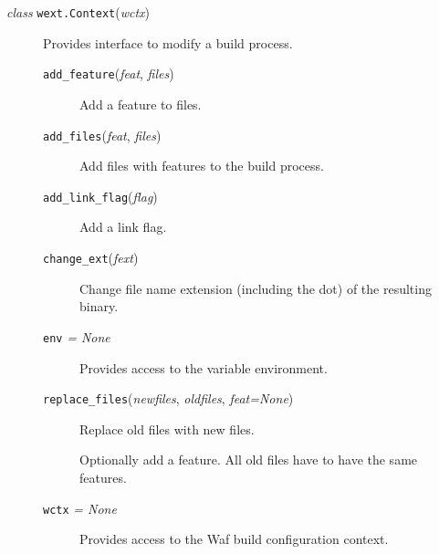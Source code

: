 \begin{description}
\item[ \emph{class} \texttt{wext.}\texttt{Context}{(}\emph{wctx}{)}]
Provides interface to modify a build process.

\begin{description}
\item[ \texttt{add\_feature}{(}\emph{feat}, \emph{files}{)}]
Add a feature to files.
\end{description}

\begin{description}
\item[ \texttt{add\_files}{(}\emph{feat}, \emph{files}{)}]
Add files with features to the build process.
\end{description}

\begin{description}
\item[ \texttt{add\_link\_flag}{(}\emph{flag}{)}]
Add a link flag.
\end{description}

\begin{description}
\item[ \texttt{change\_ext}{(}\emph{fext}{)}]
Change file name extension (including the dot) of the resulting binary.
\end{description}

\begin{description}
\item[ \texttt{env} \emph{= None}]
Provides access to the variable environment.
\end{description}

\begin{description}
\item[ \texttt{replace\_files}{(}\emph{newfiles}, \emph{oldfiles},
\emph{feat=None}{)}]
Replace old files with new files.

Optionally add a feature. All old files have to have the same features.
\end{description}

\begin{description}
\item[ \texttt{wctx} \emph{= None}]
Provides access to the Waf build configuration context.
\end{description}
\end{description}

